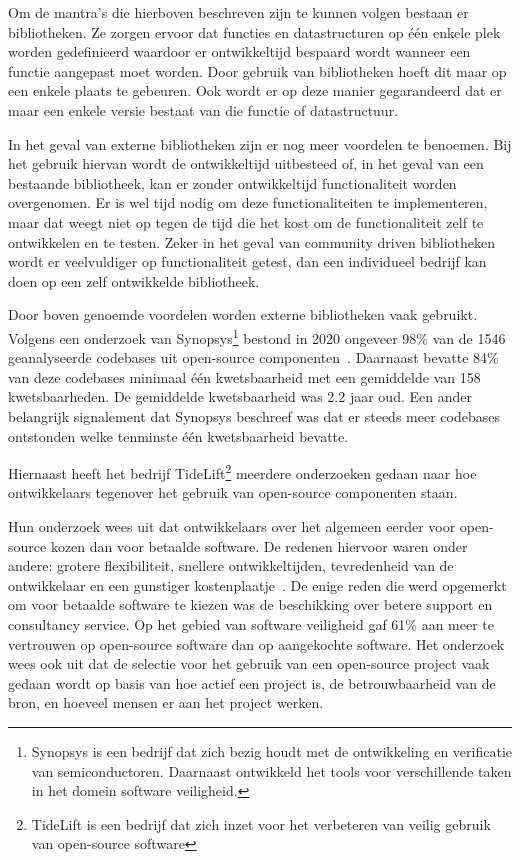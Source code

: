 Om de mantra's die hierboven beschreven zijn te kunnen volgen bestaan er bibliotheken. Ze zorgen ervoor dat functies en datastructuren op één enkele plek worden gedefinieerd waardoor er ontwikkeltijd bespaard wordt wanneer een functie aangepast moet worden. Door gebruik van bibliotheken hoeft dit maar op een enkele plaats te gebeuren. Ook wordt er op deze manier gegarandeerd dat er maar een enkele versie bestaat van die functie of datastructuur.

In het geval van externe bibliotheken zijn er nog meer voordelen te benoemen. Bij het gebruik hiervan wordt de ontwikkeltijd uitbesteed of, in het geval van een bestaande bibliotheek, kan er zonder ontwikkeltijd functionaliteit worden overgenomen. Er is wel tijd nodig om deze functionaliteiten te implementeren, maar dat weegt niet op tegen de tijd die het kost om de functionaliteit zelf te ontwikkelen en te testen. Zeker in het geval van community driven bibliotheken wordt er veelvuldiger op functionaliteit getest, dan een individueel bedrijf kan doen op een zelf ontwikkelde bibliotheek.

Door boven genoemde voordelen worden externe bibliotheken vaak gebruikt. Volgens een onderzoek van Synopsys\footnote{Synopsys is een bedrijf dat zich bezig houdt met de ontwikkeling en verificatie van semiconductoren. Daarnaast ontwikkeld het tools voor verschillende taken in het domein software veiligheid.} bestond in 2020 ongeveer 98\% van de 1546 geanalyseerde codebases uit open-source componenten~\citep{Synopsys:2021}. Daarnaast bevatte 84\% van deze codebases minimaal één kwetsbaarheid met een gemiddelde van 158 kwetsbaarheden. De gemiddelde kwetsbaarheid was 2.2 jaar oud. Een ander belangrijk signalement dat Synopsys beschreef was dat er steeds meer codebases ontstonden welke tenminste één kwetsbaarheid bevatte.

Hiernaast heeft het bedrijf TideLift\footnote{TideLift is een bedrijf dat zich inzet voor het verbeteren van veilig gebruik van open-source software} meerdere onderzoeken gedaan naar hoe ontwikkelaars tegenover het gebruik van open-source componenten staan.

Hun onderzoek wees uit dat ontwikkelaars over het algemeen eerder voor open-source kozen dan voor betaalde software. De redenen hiervoor waren onder andere: grotere flexibiliteit, snellere ontwikkeltijden, tevredenheid van de ontwikkelaar en een gunstiger kostenplaatje~\citep{TideLift:2021}. De enige reden die werd opgemerkt om voor betaalde software te kiezen was de beschikking over betere support en consultancy service. Op het gebied van software veiligheid gaf 61\% aan meer te vertrouwen op open-source software dan op aangekochte software.
Het onderzoek wees ook uit dat de selectie voor het gebruik van een open-source project vaak gedaan wordt op basis van hoe actief een project is, de betrouwbaarheid van de bron, en hoeveel mensen er aan het project werken.

